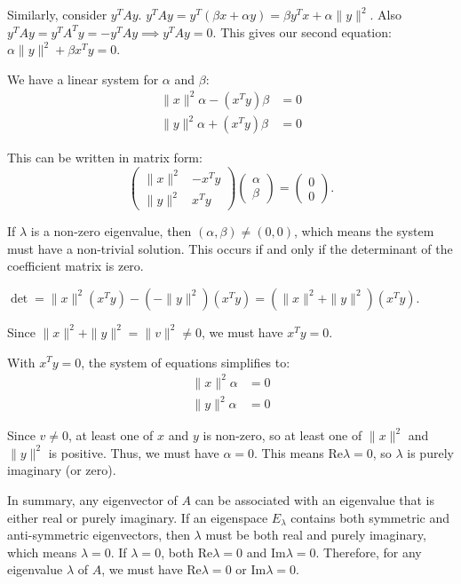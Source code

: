 \documentclass[12pt,a4paper]{article}
\theoremstyle{definition}
\begin{document}
        Similarly, consider $y^T A y$.
        $y^T A y = y^T(\beta x + \alpha y) = \beta y^T x + \alpha \|y\|^2$.
        Also $y^T A y = y^T A^T y = -y^T A y \implies y^T A y = 0$.
        This gives our second equation: $\alpha\|y\|^2 + \beta x^T y = 0$.

        We have a linear system for $\alpha$ and $\beta$:
        \begin{align}
            \|x\|^2 \alpha - (x^T y) \beta &= 0 \\
            \|y\|^2 \alpha + (x^T y) \beta &= 0
        \end{align}

        This can be written in matrix form:
        $$\begin{pmatrix} \|x\|^2 & -x^T y \\ \|y\|^2 & x^T y \end{pmatrix} \begin{pmatrix} \alpha \\ \beta \end{pmatrix} = \begin{pmatrix} 0 \\ 0 \end{pmatrix}.$$

        If $\lambda$ is a non-zero eigenvalue, then $(\alpha, \beta) \neq (0,0)$, which means the system must have a non-trivial solution. This occurs if and only if the determinant of the coefficient matrix is zero.

        $\det = \|x\|^2(x^T y) - (-\|y\|^2)(x^T y) = (\|x\|^2+\|y\|^2)(x^T y)$.

        Since $\|x\|^2+\|y\|^2 = \|v\|^2 \neq 0$, we must have $x^T y=0$.

        With $x^T y=0$, the system of equations simplifies to:
        \begin{align}
            \|x\|^2 \alpha &= 0 \\
            \|y\|^2 \alpha &= 0
        \end{align}

        Since $v \neq 0$, at least one of $x$ and $y$ is non-zero, so at least one of $\|x\|^2$ and $\|y\|^2$ is positive. Thus, we must have $\alpha=0$.
        This means $\text{Re}\lambda=0$, so $\lambda$ is purely imaginary (or zero).

        In summary, any eigenvector of $A$ can be associated with an eigenvalue that is either real or purely imaginary.
        If an eigenspace $E_\lambda$ contains both symmetric and anti-symmetric eigenvectors, then $\lambda$ must be both real and purely imaginary, which means $\lambda=0$. If $\lambda=0$, both $\text{Re}\lambda=0$ and $\text{Im}\lambda=0$.
        Therefore, for any eigenvalue $\lambda$ of $A$, we must have $\text{Re}\lambda=0$ or $\text{Im}\lambda=0$.
\end{document}
